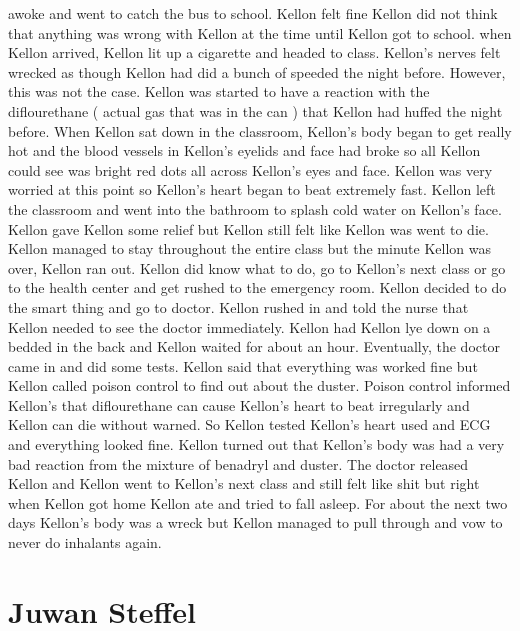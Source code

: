 \documentclass[12pt]{book}
\begin{document}
awoke and went to catch the bus to school. Kellon felt fine Kellon did not think that anything was wrong with Kellon at the time until Kellon got to school. when Kellon arrived, Kellon lit up a cigarette and headed to class. Kellon's nerves felt wrecked as though Kellon had did a bunch of speeded the night before. However, this was not the case. Kellon was started to have a reaction with the diflourethane ( actual gas that was in the can ) that Kellon had huffed the night before. When Kellon sat down in the classroom, Kellon's body began to get really hot and the blood vessels in Kellon's eyelids and face had broke so all Kellon could see was bright red dots all across Kellon's eyes and face. Kellon was very worried at this point so Kellon's heart began to beat extremely fast. Kellon left the classroom and went into the bathroom to splash cold water on Kellon's face. Kellon gave Kellon some relief but Kellon still felt like Kellon was went to die. Kellon managed to stay throughout the entire class but the minute Kellon was over, Kellon ran out. Kellon did know what to do, go to Kellon's next class or go to the health center and get rushed to the emergency room. Kellon decided to do the smart thing and go to doctor. Kellon rushed in and told the nurse that Kellon needed to see the doctor immediately. Kellon had Kellon lye down on a bedded in the back and Kellon waited for about an hour. Eventually, the doctor came in and did some tests. Kellon said that everything was worked fine but Kellon called poison control to find out about the duster. Poison control informed Kellon's that diflourethane can cause Kellon's heart to beat irregularly and Kellon can die without warned. So Kellon tested Kellon's heart used and ECG and everything looked fine. Kellon turned out that Kellon's body was had a very bad reaction from the mixture of benadryl and duster. The doctor released Kellon and Kellon went to Kellon's next class and still felt like shit but right when Kellon got home Kellon ate and tried to fall asleep. For about the next two days Kellon's body was a wreck but Kellon managed to pull through and vow to never do inhalants again.



\chapter{Juwan Steffel}
\end{document}
